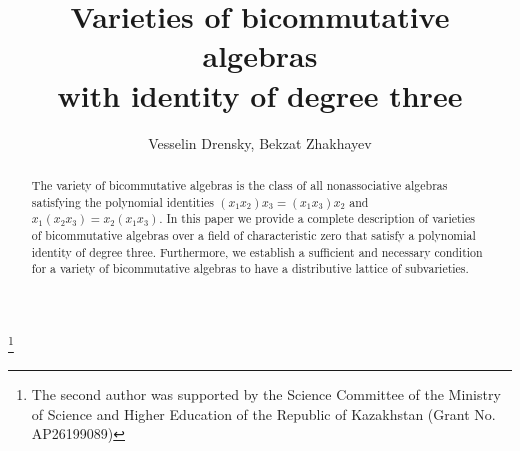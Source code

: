 \documentclass{amsart}
\theoremstyle{definition}
\begin{document}
\title[Varieties of bicommutative algebras]{Varieties of bicommutative algebras\\ with identity of degree three}

\author[Vesselin Drensky, Bekzat Zhakhayev]{Vesselin Drensky, Bekzat Zhakhayev}
\thanks{The second author was supported by the Science Committee of the Ministry of Science and Higher Education of the Republic of Kazakhstan  (Grant No. AP26199089)}
\address{Institute of Mathematics and Informatics, Bulgarian Academy of Sciences, Sofia 1113, Bulgaria}
\address{SDU University, Abylaikhan Str. 1/1,  040900, Kaskelen, Kazakhstan.\newline
Institute of Mathematics and Mathematical Modeling, Shevchenko Str. 28, 050010, Almaty, Kazakhstan}




\begin{abstract}
The variety of bicommutative algebras is the class of all nonassociative algebras satisfying the polynomial identities
$(x_1x_2)x_3=(x_1x_3)x_2$ and $x_1(x_2x_3)=x_2(x_1x_3)$. In this paper we provide a complete description of varieties of bicommutative algebras
over a field of characteristic zero that satisfy a polynomial identity of degree three.
Furthermore, we establish a sufficient and necessary condition for a variety of bicommutative algebras to have a distributive lattice of subvarieties.
\end{abstract}

\maketitle
\end{document}
